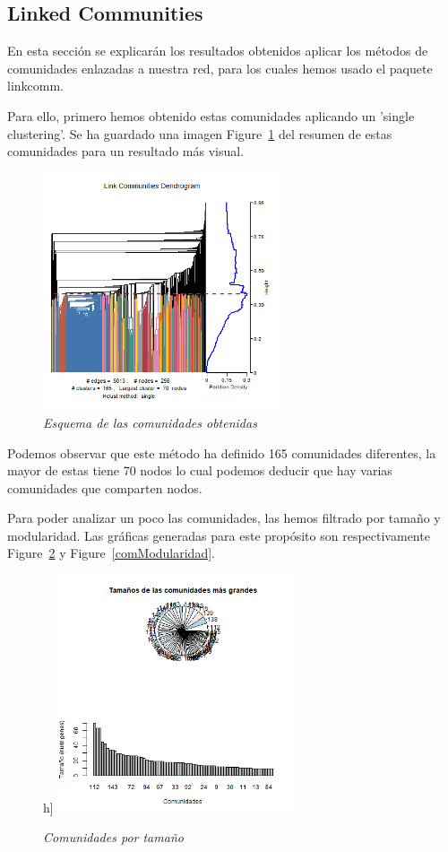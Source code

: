 \subsection{Linked Communities}
En esta sección se explicarán los resultados obtenidos aplicar los métodos de comunidades enlazadas a nuestra red, para los cuales hemos usado el paquete linkcomm.

Para ello, primero hemos obtenido estas comunidades aplicando un 'single clustering'. Se ha guardado una imagen Figure~\ref{comunidades} del resumen de estas comunidades para un resultado más visual.

\begin{figure}[h]
	\centering
	\includegraphics[width=70mm,scale=1.2]{figures/covid_lc_summary.png}
	\caption{\textit{Esquema de las comunidades obtenidas}}
	\label{comunidades}
\end{figure}

Podemos observar que este método ha definido 165 comunidades diferentes, la mayor de estas tiene 70 nodos lo cual podemos deducir que hay varias comunidades que comparten nodos.

Para poder analizar un poco las comunidades, las hemos filtrado por tamaño y modularidad. Las gráficas generadas para este propósito son respectivamente Figure~\ref{comTamaño} y Figure~\ref{comModularidad}.

\begin{figure}h]
	\centering
	\includegraphics[width=70mm,scale=1.2]{figures/lc_larger_clusters.png}
	\caption{\textit{Comunidades por tamaño}}
	\label{comTamaño}
\end{figure}

